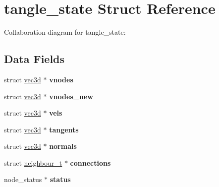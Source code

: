 \hypertarget{structtangle__state}{}\section{tangle\+\_\+state Struct Reference}
\label{structtangle__state}


Collaboration diagram for tangle\+\_\+state\+:
\subsection*{Data Fields}
\begin{DoxyCompactItemize}
\item 
struct \hyperlink{structvec3d}{vec3d} $\ast$ {\bfseries vnodes}\hypertarget{structtangle__state_a289ec7f3ebe1dc518ad56796aed4cb50}{}\label{structtangle__state_a289ec7f3ebe1dc518ad56796aed4cb50}

\item 
struct \hyperlink{structvec3d}{vec3d} $\ast$ {\bfseries vnodes\+\_\+new}\hypertarget{structtangle__state_ac3f6e1afc5b2fe54b693fd64ec589e64}{}\label{structtangle__state_ac3f6e1afc5b2fe54b693fd64ec589e64}

\item 
struct \hyperlink{structvec3d}{vec3d} $\ast$ {\bfseries vels}\hypertarget{structtangle__state_a7000e5b695298fa31cf92815dc1ff2e9}{}\label{structtangle__state_a7000e5b695298fa31cf92815dc1ff2e9}

\item 
struct \hyperlink{structvec3d}{vec3d} $\ast$ {\bfseries tangents}\hypertarget{structtangle__state_abb01069e701930cd6a18a2c6ecb10e58}{}\label{structtangle__state_abb01069e701930cd6a18a2c6ecb10e58}

\item 
struct \hyperlink{structvec3d}{vec3d} $\ast$ {\bfseries normals}\hypertarget{structtangle__state_a8bdeee9be864bccc84064f6db099658d}{}\label{structtangle__state_a8bdeee9be864bccc84064f6db099658d}

\item 
struct \hyperlink{structneighbour__t}{neighbour\+\_\+t} $\ast$ {\bfseries connections}\hypertarget{structtangle__state_a057e3b8fd324212ea24fc8ac0ba1cfde}{}\label{structtangle__state_a057e3b8fd324212ea24fc8ac0ba1cfde}

\item 
node\+\_\+status $\ast$ {\bfseries status}\hypertarget{structtangle__state_aac3816751bfb4fdb82760cd4875f16c3}{}\label{structtangle__state_aac3816751bfb4fdb82760cd4875f16c3}


\end{DoxyCompactItemize}
